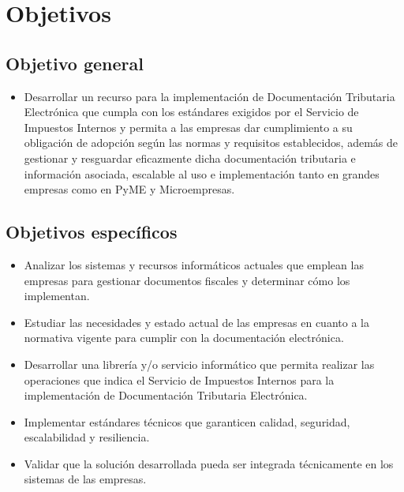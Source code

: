 \section{Objetivos}

\subsection{Objetivo general}

\begin{itemize} 
    \item Desarrollar un recurso para la implementación de Documentación Tributaria Electrónica que cumpla con los estándares exigidos por el Servicio de Impuestos Internos y permita a las empresas dar cumplimiento a su obligación de adopción según las normas y requisitos establecidos, además de gestionar y resguardar eficazmente dicha documentación tributaria e información asociada, escalable al uso e implementación tanto en grandes empresas como en PyME y Microempresas.
\end{itemize}

\subsection{Objetivos específicos}

\begin{itemize}
	\item Analizar los sistemas y recursos informáticos actuales que emplean las empresas para gestionar documentos fiscales y determinar cómo los implementan.
	\item Estudiar las necesidades y estado actual de las empresas en cuanto a la normativa vigente para cumplir con la documentación electrónica.
	\item Desarrollar una librería y/o servicio informático que permita realizar las operaciones que indica el Servicio de Impuestos Internos para la implementación de Documentación Tributaria Electrónica.
	\item Implementar estándares técnicos que garanticen calidad, seguridad, escalabilidad y resiliencia.
	\item Validar que la solución desarrollada pueda ser integrada técnicamente en los sistemas de las empresas.
\end{itemize}